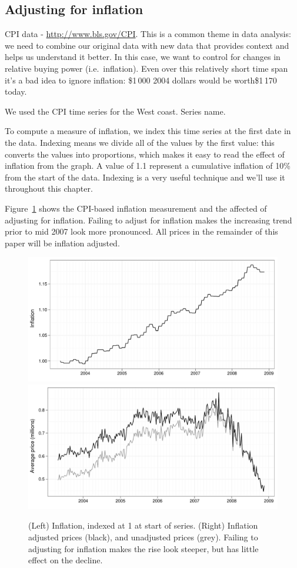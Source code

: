 \documentclass[oneside]{article}
\begin{document}
\subsection{Adjusting for inflation}

CPI data - \url{http://www.bls.gov/CPI}.  This is a common theme in data analysis: we need to combine our original data with new data that provides context and helps us understand it better.  In this case, we want to control for changes in relative buying power (i.e.\ inflation).  Even over this relatively short time span it's a bad idea to ignore inflation: \$1\,000 2004 dollars would be worth\$1\,170 today.

We used the CPI time series for the West coast.  Series name.

To compute a measure of inflation, we index this time series at the first date in the data.  Indexing means we divide all of the values by the first value: this converts the values into proportions, which makes it easy to read the effect of inflation from the graph.  A value of 1.1 represent a cumulative inflation of 10\% from the start of the data.  Indexing is a very useful technique and we'll use it throughout this chapter.

Figure~\ref{fig:inflation} shows the CPI-based inflation measurement and the affected of adjusting for inflation.  Failing to adjust for inflation makes the increasing trend prior to mid 2007 look more pronounced.  All prices in the remainder of this paper will be inflation adjusted.

\begin{figure}[htbp]
  \centering
    \includegraphics[width=0.5 \linewidth]{daily-cpi}%
    \includegraphics[width=0.5 \linewidth]{daily-price-adj}
  \caption{(Left) Inflation, indexed at 1 at start of series.  (Right) Inflation adjusted prices (black), and unadjusted prices (grey).  Failing to adjusting for inflation makes the rise look steeper, but has little effect on the decline.}
  \label{fig:inflation}
\end{figure}
\end{document}
